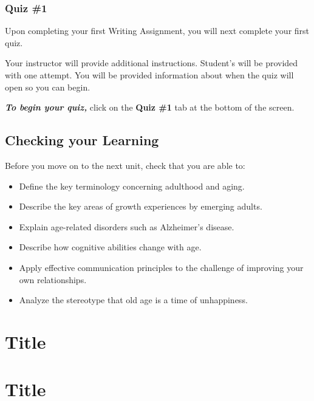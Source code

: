 \documentclass[
]{book}
\begin{document}
\hypertarget{quiz-1}{%
\subsection*{Quiz \#1}\label{quiz-1}}

Upon completing your first Writing Assignment, you will next complete your first quiz.

Your instructor will provide additional instructions. Student's will be provided with one attempt. You will be provided information about when the quiz will open so you can begin.

\textbf{\emph{To begin your quiz,}} click on the \textbf{Quiz \#1} tab at the bottom of the screen.

\hypertarget{checking-your-learning-1}{%
\section*{Checking your Learning}\label{checking-your-learning-1}}

Before you move on to the next unit, check that you are able to:

\begin{itemize}
\item
  Define the key terminology concerning adulthood and aging.
\item
  Describe the key areas of growth experiences by emerging adults.
\item
  Explain age-related disorders such as Alzheimer's disease.
\item
  Describe how cognitive abilities change with age.
\item
  Apply effective communication principles to the challenge of improving your own relationships.
\item
  Analyze the stereotype that old age is a time of unhappiness.
\end{itemize}

\hypertarget{title}{%
\chapter{Title}\label{title}}

\hypertarget{title-1}{%
\chapter{Title}\label{title-1}}
\end{document}
